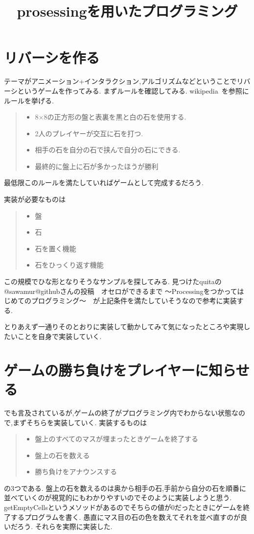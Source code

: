 \documentclass[12pt,a4j]{jarticle}
\begin{document}
\title{prosessingを用いたプログラミング}
\maketitle
\section{リバーシを作る}
テーマがアニメーション+インタラクション,アルゴリズムなどということでリバーシというゲームを作ってみる.
まずルールを確認してみる.
wikipedia~\cite{wiki}を参照にルールを挙げる. 
\begin{quote}
  \begin{itemize}
   \item 8×8の正方形の盤と表裏を黒と白の石を使用する.
   \item 2人のプレイヤーが交互に石を打つ.
   \item 相手の石を自分の石で挟んで自分の石にできる.
   \item 最終的に盤上に石が多かったほうが勝利
  \end{itemize}
 \end{quote}
最低限このルールを満たしていればゲームとして完成するだろう.

実装が必要なものは
\begin{quote}
  \begin{itemize}
   \item 盤
   \item 石
   \item 石を置く機能
   \item 石をひっくり返す機能
  \end{itemize}
\end{quote}

この規模でひな形となりそうなサンプルを探してみる.
見つけたquitaの@sawamur@githubさんの投稿　オセロができるまで 〜Processingをつかってはじめてのプログラミング〜　\cite{quita}が上記条件を満たしていそうなので参考に実装する.

とりあえず一通りそのとおりに実装して動かしてみて気になったところや実現したいことを自身で実装していく.

\section{ゲームの勝ち負けをプレイヤーに知らせる}

\cite{quita}でも言及されているが,ゲームの終了がプログラミング内でわからない状態なので,まずそちらを実装していく.
実装するものは
\begin{quote}
  \begin{itemize}
  \item 盤上のすべてのマスが埋まったときゲームを終了する
  \item 盤上の石を数える
  \item 勝ち負けをアナウンスする
  \end{itemize}
\end{quote}
の3つである. 盤上の石を数えるのは奥から相手の石,手前から自分の石を順番に並べていくのが視覚的にもわかりやすいのでそのように実装しようと思う.
getEmptyCellsというメソッドがあるのでそちらの値が0だったときにゲームを終了するプログラムを書く.
愚直にマス目の石の色を数えてそれを並べ直すのが良いだろう.
それらを実際に実装した.
\end{document}
